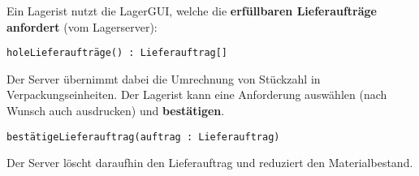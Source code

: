 Ein Lagerist nutzt die LagerGUI, welche die \textbf{erfüllbaren Lieferaufträge anfordert} (vom Lagerserver):

\texttt{holeLieferaufträge() : Lieferauftrag[]}

Der Server übernimmt dabei die Umrechnung von Stückzahl in Verpackungseinheiten.
Der Lagerist kann eine Anforderung auswählen (nach Wunsch auch ausdrucken) und \textbf{bestätigen}.

\texttt{bestätigeLieferauftrag(auftrag : Lieferauftrag)}

Der Server löscht daraufhin den Lieferauftrag und reduziert den Materialbestand.